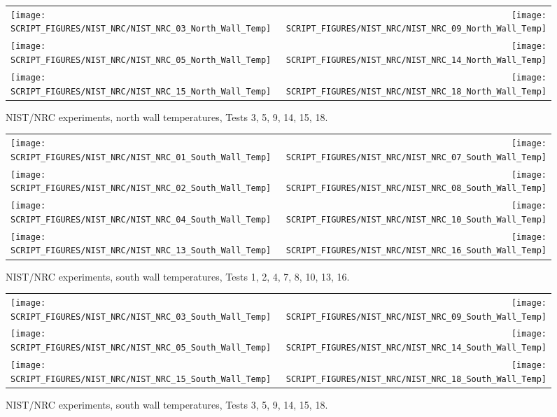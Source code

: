\begin{figure}[p]
\begin{tabular*}{\textwidth}{l@{\extracolsep{\fill}}r}
\texttt{[image: SCRIPT\_FIGURES/NIST\_NRC/NIST\_NRC\_03\_North\_Wall\_Temp]} &
\texttt{[image: SCRIPT\_FIGURES/NIST\_NRC/NIST\_NRC\_09\_North\_Wall\_Temp]} \\
\texttt{[image: SCRIPT\_FIGURES/NIST\_NRC/NIST\_NRC\_05\_North\_Wall\_Temp]} &
\texttt{[image: SCRIPT\_FIGURES/NIST\_NRC/NIST\_NRC\_14\_North\_Wall\_Temp]} \\
\texttt{[image: SCRIPT\_FIGURES/NIST\_NRC/NIST\_NRC\_15\_North\_Wall\_Temp]} &
\texttt{[image: SCRIPT\_FIGURES/NIST\_NRC/NIST\_NRC\_18\_North\_Wall\_Temp]}
\end{tabular*}
\caption{NIST/NRC experiments, north wall temperatures, Tests 3, 5, 9, 14, 15, 18.}
\label{NIST_NRC_North_Wall_Temp_Open}
\end{figure}

\begin{figure}[p]
\begin{tabular*}{\textwidth}{l@{\extracolsep{\fill}}r}
\texttt{[image: SCRIPT\_FIGURES/NIST\_NRC/NIST\_NRC\_01\_South\_Wall\_Temp]} &
\texttt{[image: SCRIPT\_FIGURES/NIST\_NRC/NIST\_NRC\_07\_South\_Wall\_Temp]} \\
\texttt{[image: SCRIPT\_FIGURES/NIST\_NRC/NIST\_NRC\_02\_South\_Wall\_Temp]} &
\texttt{[image: SCRIPT\_FIGURES/NIST\_NRC/NIST\_NRC\_08\_South\_Wall\_Temp]} \\
\texttt{[image: SCRIPT\_FIGURES/NIST\_NRC/NIST\_NRC\_04\_South\_Wall\_Temp]} &
\texttt{[image: SCRIPT\_FIGURES/NIST\_NRC/NIST\_NRC\_10\_South\_Wall\_Temp]} \\
\texttt{[image: SCRIPT\_FIGURES/NIST\_NRC/NIST\_NRC\_13\_South\_Wall\_Temp]} &
\texttt{[image: SCRIPT\_FIGURES/NIST\_NRC/NIST\_NRC\_16\_South\_Wall\_Temp]}
\end{tabular*}
\caption{NIST/NRC experiments, south wall temperatures, Tests 1, 2, 4, 7, 8, 10, 13, 16.}
\label{NIST_NRC_South_Wall_Temp_Closed}
\end{figure}

\begin{figure}[p]
\begin{tabular*}{\textwidth}{l@{\extracolsep{\fill}}r}
\texttt{[image: SCRIPT\_FIGURES/NIST\_NRC/NIST\_NRC\_03\_South\_Wall\_Temp]} &
\texttt{[image: SCRIPT\_FIGURES/NIST\_NRC/NIST\_NRC\_09\_South\_Wall\_Temp]} \\
\texttt{[image: SCRIPT\_FIGURES/NIST\_NRC/NIST\_NRC\_05\_South\_Wall\_Temp]} &
\texttt{[image: SCRIPT\_FIGURES/NIST\_NRC/NIST\_NRC\_14\_South\_Wall\_Temp]} \\
\texttt{[image: SCRIPT\_FIGURES/NIST\_NRC/NIST\_NRC\_15\_South\_Wall\_Temp]} &
\texttt{[image: SCRIPT\_FIGURES/NIST\_NRC/NIST\_NRC\_18\_South\_Wall\_Temp]}
\end{tabular*}
\caption{NIST/NRC experiments, south wall temperatures, Tests 3, 5, 9, 14, 15, 18.}
\label{NIST_NRC_South_Wall_Temp_Open}
\end{figure}

